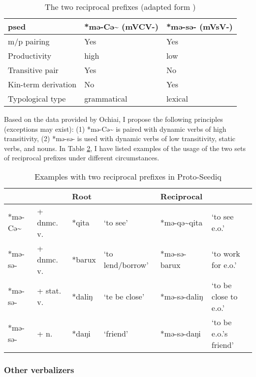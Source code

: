 \begin{table}[!htbp]
\centering
\caption{The two reciprocal prefixes (adapted form \textcite[182]{ochiai2016reciprocals})}
\label{tab:psed_recp_ochi}
\begin{tabular}{lll}
\hline
\ac{psed}           & *mə-Cə\~{} (mVCV-) & *mə-sə- (mVsV-) \\ \hline
m/p pairing         & Yes                & Yes             \\
Productivity        & high               & low             \\
Transitive pair     & Yes                & No              \\
Kin-term derivation & No                 & Yes             \\
Typological type    & grammatical        & lexical         \\ \hline
\end{tabular}
\end{table}

Based on the data provided by Ochiai, I propose the following principles (exceptions may exist): (1) *mə-Cə\~{} is paired with dynamic verbs of high transitivity, (2) *mə-sə- is used with dynamic verbs of low transitivity, static verbs, and nouns. In Table \ref{tab:psed_recp_ex}, I have listed examples of the usage of the two sets of reciprocal prefixes under different circumstances.

\begin{table}[!htbp]
\centering
\caption{Examples with two reciprocal prefixes in Proto-Seediq}
\label{tab:psed_recp_ex}
\begin{tabular}{llllll}
\hline
           &            & Root  &                  & Reciprocal    &                            \\ \hline
*mə-Cə\~{} & + dnmc. v. & *qita  & `to see'         & *mə-qə\~{}qita & `to see e.o.'              \\
*mə-sə-    & + dnmc. v. & *barux & `to lend/borrow' & *mə-sə-barux   & `to work for e.o.' \\
*mə-sə-    & + stat. v. & *daliŋ & `te be close'    & *mə-sə-daliŋ   & `to be close to e.o.'      \\
*mə-sə-    & + n.       & *daŋi  & `friend'         & *mə-sə-daŋi    & `to be e.o.'s friend'  \\ \hline
\end{tabular}
\end{table}

\subsubsection{Other verbalizers}

